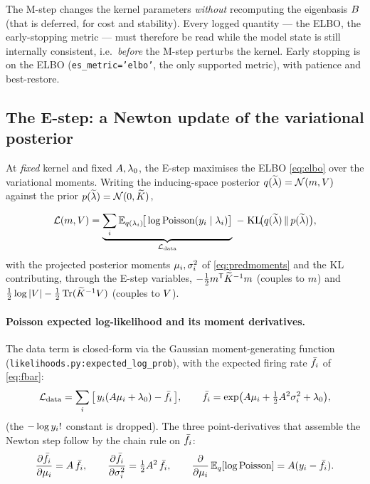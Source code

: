 \begin{remark}
The M-step changes the kernel parameters \emph{without} recomputing the
eigenbasis $B$ (that is deferred, for cost and stability). Every logged
quantity --- the ELBO, the early-stopping metric --- must therefore be read while
the model state is still internally consistent, i.e.\ \emph{before} the M-step
perturbs the kernel. Early stopping is on the ELBO (\texttt{es\_metric='elbo'},
the only supported metric), with patience and best-restore.
\end{remark}

\subsection{The E-step: a Newton update of the variational posterior}
\label{subsec:estep}

At \emph{fixed} kernel and fixed $A,\lambda_{0}$, the E-step maximises the ELBO
\eqref{eq:elbo} over the variational moments. Writing the inducing-space
posterior $q(\widetilde{\lambda})=\mathcal{N}(m,V)$ against the prior $p(\widetilde{\lambda})=\mathcal{N}(0,\widetilde{K})$,

\begin{equation}
\mathcal{L}(m,V)
  = \underbrace{\sum_i \mathbb{E}_{q(\lambda_i)}\!\big[\log\mathrm{Poisson}(y_i\mid\lambda_i)\big]}_{\mathcal{L}_{\mathrm{data}}}
    \;-\; \mathrm{KL}\!\big(q(\widetilde{\lambda})\,\|\,p(\widetilde{\lambda})\big),
\label{eq:estep-obj}
\end{equation}
with the projected posterior moments $\mu_i,\sigma^{2}_i$ of \eqref{eq:predmoments}
and the KL contributing, through the E-step variables,
$-\tfrac12m^{\mathsf{T}}\widetilde{K}^{-1}m$ (couples to $m$) and
$\tfrac12\log|V|-\tfrac12\operatorname{Tr}(\widetilde{K}^{-1}V)$ (couples to $V$).

\paragraph{Poisson expected log-likelihood and its moment derivatives.}
The data term is closed-form via the Gaussian moment-generating function
(\texttt{likelihoods.py:expected\_log\_prob}), with the expected firing rate
$\bar{f}_i$ of \eqref{eq:fbar}:
\begin{equation}
\mathcal{L}_{\mathrm{data}}
  = \sum_i\big[\,y_i(A\mu_i+\lambda_{0})-\bar{f}_i\,\big],
\qquad
\bar{f}_i=\exp\!\big(A\mu_i+\tfrac12A^2\sigma^{2}_i+\lambda_{0}\big),
\end{equation}
(the $-\log y_i!$ constant is dropped). The three point-derivatives that
assemble the Newton step follow by the chain rule on $\bar{f}_i$:
\begin{equation}
\frac{\partial\bar{f}_i}{\partial\mu_i}=A\,\bar{f}_i,\qquad
\frac{\partial\bar{f}_i}{\partial\sigma^{2}_i}=\tfrac12A^2\,\bar{f}_i,\qquad
\frac{\partial}{\partial\mu_i}\,\mathbb{E}_{q}[\log\mathrm{Poisson}]=A(y_i-\bar{f}_i).
\end{equation}

